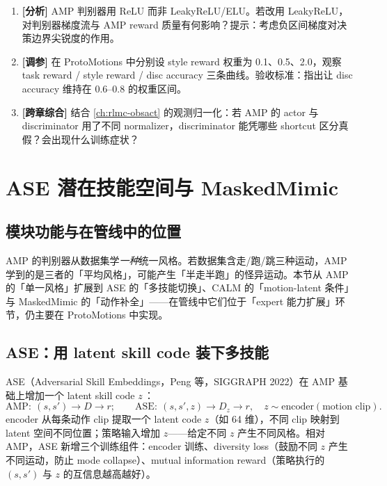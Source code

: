 \begin{practice}[练习·AMP]
\begin{enumerate}
  \item \textbf{[分析]} AMP 判别器用 ReLU 而非 LeakyReLU/ELU。若改用 LeakyReLU，对判别器梯度流与 AMP reward 质量有何影响？提示：考虑负区间梯度对决策边界尖锐度的作用。
  \item \textbf{[调参]} 在 ProtoMotions 中分别设 style reward 权重为 0.1、0.5、2.0，观察 task reward / style reward / disc accuracy 三条曲线。验收标准：指出让 disc accuracy 维持在 0.6--0.8 的权重区间。
  \item \textbf{[跨章综合]} 结合 \cref{ch:rlmc-obsact} 的观测归一化：若 AMP 的 actor 与 discriminator 用了不同 normalizer，discriminator 能凭哪些 shortcut 区分真假？会出现什么训练症状？
\end{enumerate}
\end{practice}

\section{ASE 潜在技能空间与 MaskedMimic}
\label{sec:rlmc-imit-ase}

\subsection{模块功能与在管线中的位置}
\label{sec:rlmc-imit-ase-pos}

AMP 的判别器从数据集学\emph{一种}统一风格。若数据集含走/跑/跳三种运动，AMP 学到的是三者的「平均风格」，可能产生「半走半跑」的怪异运动。本节从 AMP 的「单一风格」扩展到 ASE 的「多技能切换」、CALM 的「motion-latent 条件」与 MaskedMimic 的「动作补全」——在管线中它们位于「expert 能力扩展」环节，仍主要在 ProtoMotions 中实现。

\subsection{ASE：用 latent skill code 装下多技能}
\label{sec:rlmc-imit-ase-arch}

ASE（Adversarial Skill Embeddings，Peng 等，SIGGRAPH 2022）在 AMP 基础上增加一个 latent skill code $z$\,\cite{peng2022ase}：
\[
\text{AMP}:\ (s,s')\to D\to r; \qquad \text{ASE}:\ (s,s',z)\to D_z\to r,\quad z\sim\text{encoder}(\text{motion clip}).
\]
encoder 从每条动作 clip 提取一个 latent code $z$（如 64 维），不同 clip 映射到 latent 空间不同位置；策略输入增加 $z$——给定不同 $z$ 产生不同风格。相对 AMP，ASE 新增三个训练组件：encoder 训练、diversity loss（鼓励不同 $z$ 产生不同运动，防止 mode collapse）、mutual information reward（策略执行的 $(s,s')$ 与 $z$ 的互信息越高越好）。

